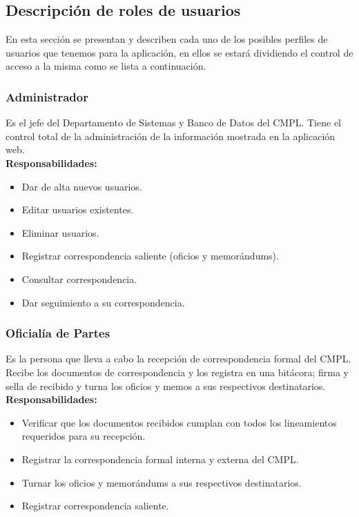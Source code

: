 \subsection{Descripción de roles de usuarios}
En esta sección se presentan y describen cada uno de los posibles perfiles de usuarios que tenemos para la aplicación, en ellos se estará dividiendo el control de acceso a la misma como se lista a continuación.\\

\subsubsection{Administrador}
Es el jefe del Departamento de Sistemas y Banco de Datos del CMPL. Tiene el control total de la administración de la información mostrada en la aplicación web.\\

\textbf{Responsabilidades:}
\begin{itemize}
	\item Dar de alta nuevos usuarios.
	\item Editar usuarios existentes.
	\item Eliminar usuarios.
	\item Registrar correspondencia saliente (oficios y memorándums).
	\item Consultar correspondencia.
	\item Dar seguimiento a su correspondencia.
\end{itemize}

\subsubsection{Oficialía de Partes}
Es la persona que lleva a cabo la recepción de correspondencia formal del CMPL. Recibe los documentos de correspondencia y los registra en una bitácora; firma y sella de recibido y turna los oficios y memos a sus respectivos destinatarios.\\

\textbf{Responsabilidades:}
\begin{itemize}
	\item Verificar que los documentos recibidos cumplan con todos los lineamientos requeridos para su recepción.
	\item Registrar la correspondencia formal interna y externa del CMPL.
	\item Turnar los oficios y memorándums a sus respectivos destinatarios.
	\item Registrar correspondencia saliente.
\end{itemize}

